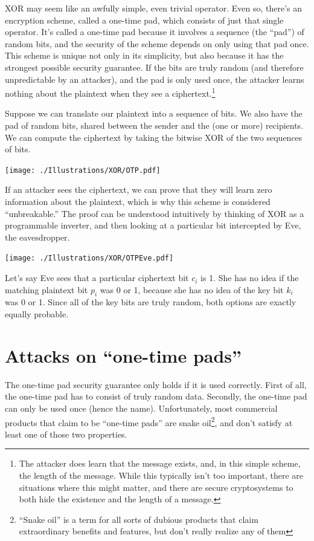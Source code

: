 \documentclass[11pt,ebook,table,dvipsnames]{memoir}
\begin{document}
XOR may seem like an awfully simple, even trivial operator. Even so,
there's an encryption scheme, called a one-time pad, which consists of
just that single operator. It's called a one-time pad because it
involves a sequence (the \enquote{pad}) of random bits, and the security of
the scheme depends on only using that pad once. This scheme is unique
not only in its simplicity, but also because it has the strongest
possible security guarantee. If the bits are truly random (and
therefore unpredictable by an attacker), and the pad is only used
once, the attacker learns nothing about the plaintext when they see a
ciphertext.\footnote{The attacker does learn that the message exists, and,
in this simple scheme, the length of the message. While this typically
isn't too important, there are situations where this might matter, and
there are secure cryptosystems to both hide the existence and the
length of a message.}

Suppose we can translate our plaintext into a sequence of bits. We
also have the pad of random bits, shared between the sender and the
(one or more) recipients. We can compute the ciphertext by taking the
bitwise XOR of the two sequences of bits.

\texttt{[image: ./Illustrations/XOR/OTP.pdf]}

If an attacker sees the ciphertext, we can prove that they will learn
zero information about the plaintext, which is why this scheme is
considered \enquote{unbreakable.} The proof can be understood intuitively by
thinking of XOR as a programmable inverter, and then looking at a
particular bit intercepted by Eve, the eavesdropper.

\texttt{[image: ./Illustrations/XOR/OTPEve.pdf]}

Let's say Eve sees that a particular ciphertext bit $c_i$ is 1. She
has no idea if the matching plaintext bit $p_i$ was 0 or 1, because
she has no idea of the key bit $k_i$ was 0 or 1. Since all of the key
bits are truly random, both options are exactly equally probable.
\section{Attacks on \enquote{one-time pads}}
\label{sec-2-1-5}

The one-time pad security guarantee only holds if it is used
correctly. First of all, the one-time pad has to consist of truly
random data. Secondly, the one-time pad can only be used once (hence
the name). Unfortunately, most commercial products that claim to be
\enquote{one-time pads} are snake oil\footnote{\enquote{Snake oil} is a term for all sorts
of dubious products that claim extraordinary benefits and features,
but don't really realize any of them}, and don't satisfy at least one
of those two properties.
\end{document}

